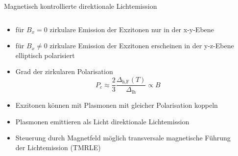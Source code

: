 \begin{frame}{Magnetisch kontrollierte direktionale Lichtemission}
    \begin{columns}
        \begin{column}{0.5\textwidth}
            \begin{itemize}
                \item <1-> für $B_{x} = 0$ zirkulare Emission der Exzitonen nur in der x-y-Ebene
                \item <3-> für $B_{x} \neq 0$ zirkulare Emission der Exzitonen erscheinen in der y-z-Ebene
                elliptisch polarisiert 
                \item <4-> Grad der zirkularen Polarisation
                \begin{equation*}
                    P_c \approx \frac{2}{3} \frac{\Delta_\text{h,F}(T)}{\Delta_\text{lh}} \propto B
                    \label{eq:pc}
                \end{equation*}
                \item <5-> Exzitonen können mit Plasmonen mit gleicher Polarisation koppeln 
                \item <6-> Plasmonen emittieren als Licht \rightarrow direktionale Lichtemission
                \item <7-> Steuerung durch Magnetfeld möglich \rightarrow transversale magnetische Führung der Lichtemission (TMRLE)
            \end{itemize}
        \end{column}
        \begin{column}{0.5\textwidth}
            \centering
        \end{column}
    \end{columns}
\end{frame}

